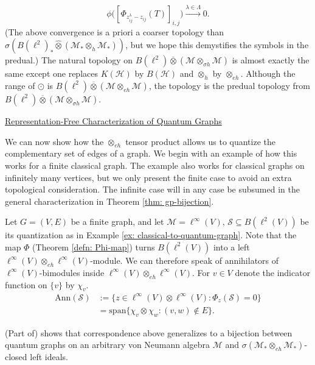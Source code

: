 \documentclass[12pt]{article}
\theoremstyle{definition}
\newenvironment{remark}
  {\pushQED{\qed}\renewcommand{\qedsymbol}{\textcircled{\tiny R}}\remarkx}
  {\popQED\endremarkx}
\newenvironment{example}
  {\pushQED{\qed}\renewcommand{\qedsymbol}{\textcircled{\tiny E}}\examplex}
  {\popQED\endexamplex}
\newcommand{\Span}{\text{span}}
\newcommand{\mc}[1]{\mathcal{#1}}
\newcommand{\<}{\langle}
\renewcommand{\>}{\rangle}
\newcommand{\Ann}{\text{Ann}}
\renewcommand{\hat}[1]{\widehat{#1}}
\renewcommand{\subset}{\subseteq}
\newcommand{\eh}{\otimes_{eh}}
\renewcommand{\bar}[1]{\overline{#1}}
\begin{document}
\begin{remark}
    \[
    \phi\bigg( [\Phi_{z^\lambda_{ij}-z_{ij}}(T)]_{i,j}\bigg) \overset{\lambda \in \Lambda}{\longrightarrow} 0.
    \]
    (The above convergence is a priori a coarser topology than $\sigma(B(\ell^2)_* \hat \otimes (\mc M_* \otimes_{h} \mc M_*))$, but we hope this demystifies the symbols in the predual.) The natural topology on $B(\ell^2) \overline{\otimes} (\mc M \otimes_{\sigma h} \mc M)$ is almost exactly the same except one replaces $K(\mc H)$ by $B(\mc H)$ and $\otimes_h$ by $\eh$. Although the range of $\odot$ is $B(\ell^2) \bar \otimes (\mc M \eh \mc M)$, the topology is the predual topology from $B(\ell^2) \bar \otimes (\mc M \otimes_{\sigma h} \mc M)$.
\end{remark}

\underline{Representation-Free Characterization of Quantum Graphs}  \label{par: annihilator characterization}

We can now show how the $\eh$ tensor product allows us to quantize the complementary set of edges of a graph. We begin with an example of how this works for a finite classical graph. The example also works for classical graphs on infinitely many vertices, but we only present the finite case to avoid an extra topological consideration. The infinite case will in any case be subsumed in the general characterization in Theorem \ref{thm: gp-bijection}.

\begin{example} \label{ex: eh-ann}
    Let $G = (V,E)$ be a finite graph, and let $\mc M = \ell^\infty(V)$, $\mc S \subset B(\ell^2(V))$ be its quantization as in Example \ref{ex: classical-to-quantum-graph}. Note that the map $\Phi$ (Theorem \ref{defn: Phi-map}) turns $B(\ell^2(V))$ into a left $\ell^\infty(V) \eh \ell^\infty(V)$-module. We can therefore speak of annihilators of $\ell^\infty(V)$-bimodules inside $\ell^\infty(V) \eh \ell^\infty(V)$. For $v \in V$ denote the indicator function on $\{v\}$ by $\chi_v$.
    \begin{align*}
    \Ann(\mc S) &:= \{z \in \ell^\infty(V) \otimes \ell^\infty (V) : \Phi_z(\mc S) = 0 \} \\
    &= \Span\{\chi_v \otimes \chi_w : (v,w) \notin E\}.
    \end{align*}
\end{example}


(Part of) \cite[Theorem 3.3]{gp-obs} shows that correspondence above generalizes to a bijection between quantum graphs on an arbitrary von Neumann algebra $\mc M$ and $\sigma(\mc M_* \eh \mc M_*)$-closed left ideals. 
\end{document}
